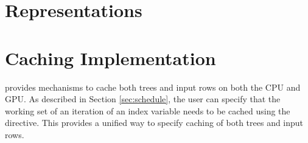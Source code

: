 \section{Representations}


\section{Caching Implementation}
\label{sec:caching}


\Treebeard{} provides mechanisms to cache both trees and input rows 
on both the CPU and GPU. As described in Section \ref{sec:schedule}, 
the user can specify that the working set of an iteration of an index
variable needs to be cached using the  directive. This 
provides a unified way to specify caching of both trees and input rows.

